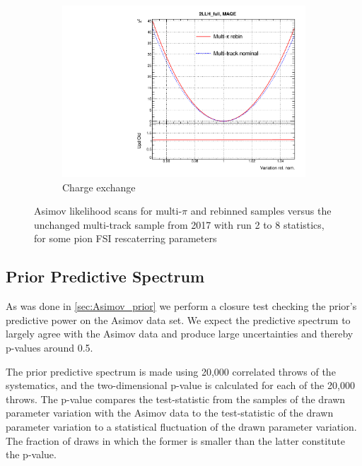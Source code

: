 \begin{figure}[h]
\begin{subfigure}[t]{0.32\textwidth}
		\includegraphics[width=\textwidth,page=11, trim={0mm 0mm 0mm 9mm}, clip]{figures/mach3/2018/llh/MultiPi_vs_MultiTrack_TotalLLH}
		\caption{Charge exchange}
	\end{subfigure}
	\caption{Asimov likelihood scans for multi-$\pi$ and rebinned samples versus the unchanged multi-track sample from 2017 with run 2 to 8 statistics, for some pion FSI rescaterring parameters}
	\label{fig:llh_multitrack_vs_multipi_fsi}
\end{figure}

\subsection{Prior Predictive Spectrum}
As was done in \autoref{sec:Asimov_prior} we perform a closure test checking the prior's predictive power on the Asimov data set. We expect the predictive spectrum to largely agree with the Asimov data and produce large uncertainties and thereby p-values around 0.5.

The \pmu \cosmu prior predictive spectrum is made using 20,000 correlated throws of the systematics, and the two-dimensional p-value is calculated for each of the 20,000 throws. The p-value compares the test-statistic from the samples of the drawn parameter variation with the Asimov data to the test-statistic of the drawn parameter variation to a statistical fluctuation of the drawn parameter variation. The fraction of draws in which the former is smaller than the latter constitute the p-value.

